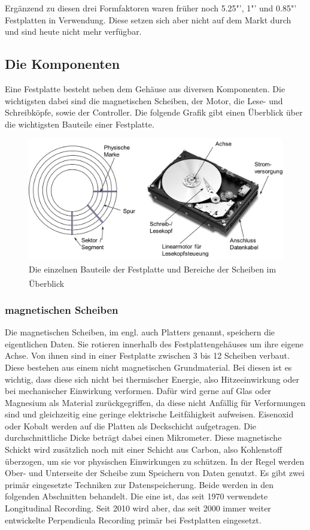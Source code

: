 \documentclass[a4paper, DIV20, 12pt, headsepline, parskip, flushleft]{scrartcl}
\begin{document}
Ergänzend zu diesen drei Formfaktoren waren früher noch 5.25"', 1"' und 0.85"' Festplatten in Verwendung. Diese setzen sich aber nicht auf dem Markt durch und sind heute nicht mehr verfügbar.

\subsection{Die Komponenten}
Eine Festplatte besteht neben dem Gehäuse aus diversen Komponenten. Die wichtigsten dabei sind die magnetischen Scheiben, der Motor, die Lese- und Schreibköpfe, sowie der Controller. Die folgende Grafik gibt einen Überblick über die wichtigsten Bauteile einer Festplatte.
\begin{figure}[H]
\begin{center}
\includegraphics[scale=1.1]{hddoverview.jpg}
\end{center}
\caption{Die einzelnen Bauteile der Festplatte und Bereiche der Scheiben im Überblick\textsuperscript{\cite{img:hdd}}}
\end{figure} 
\subsubsection{magnetischen Scheiben}
Die magnetischen Scheiben, im engl. auch Platters genannt, speichern die eigentlichen Daten.
Sie rotieren innerhalb des Festplattengehäuses um ihre eigene Achse.
Von ihnen sind in einer Festplatte zwischen 3 bis 12 Scheiben verbaut. 
Diese bestehen aus einem nicht magnetischen Grundmaterial. Bei diesen ist es wichtig, dass diese sich nicht bei thermischer Energie, also Hitzeeinwirkung oder bei mechanischer Einwirkung verformen. Dafür wird gerne auf Glas oder Magnesium als Material zurückgegriffen, da diese nicht Anfällig für Verformungen sind und gleichzeitig eine geringe elektrische Leitfähigkeit aufweisen.
Eisenoxid oder Kobalt werden auf die Platten als Deckschicht aufgetragen. Die durchschnittliche Dicke beträgt dabei einen Mikrometer. Diese magnetische Schickt wird zusätzlich noch mit einer Schicht aus Carbon, also Kohlenstoff überzogen, um sie vor physischen Einwirkungen zu schützen.
In der Regel werden Ober- und Unterseite der Scheibe zum Speichern von Daten genutzt.
Es gibt zwei primär eingesetzte Techniken zur Datenspeicherung. Beide werden in den folgenden Abschnitten behandelt. Die eine ist, das seit 1970 verwendete Longitudinal Recording.
Seit 2010 wird aber, das seit 2000 immer weiter entwickelte Perpendicula Recording primär bei Festplatten eingesetzt. 
\end{document}
